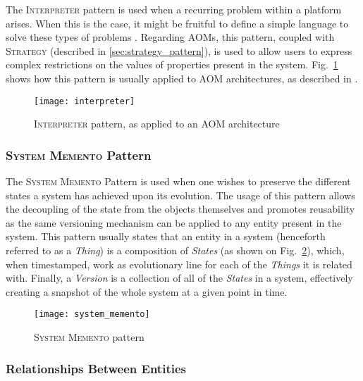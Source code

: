 The \textsc{Interpreter} pattern is used when a recurring problem within a platform arises. When this is the case, it might be fruitful to define a simple language to solve these types of problems \cite{gang_of_four}. Regarding AOMs, this pattern, coupled with \textsc{Strategy} (described in \ref{sec:strategy_pattern}), is used to allow users to express complex restrictions on the values of properties present in the system. Fig.~\ref{fig:interpreter_pattern} shows how this pattern is usually applied to AOM architectures, as described in \cite{phd_hugo_ferreira}.

\begin{figure}[H]
  \centering
  \texttt{[image: interpreter]}
  \caption{\textsc{Interpreter} pattern, as applied to an AOM architecture}
  \label{fig:interpreter_pattern}
\end{figure}

\subsubsection{\textsc{System Memento} Pattern}\label{sec:system_memento_pattern}

The \textsc{System Memento} Pattern is used when one wishes to preserve the different states a system has achieved upon its evolution. The usage of this pattern allows the decoupling of the state from the objects themselves and promotes reusability as the same versioning mechanism can be applied to any entity present in the system. This pattern usually states that an entity in a system (henceforth referred to as a \emph{Thing}) is a composition of \emph{States} (as shown on Fig.~\ref{fig:system_memento}), which, when timestamped, work as evolutionary line for each of the \emph{Things} it is related with. Finally, a \emph{Version} is a collection of all of the \emph{States} in a system, effectively creating a snapshot of the whole system at a given point in time.

\begin{figure}[H]
  \centering
  \texttt{[image: system\_memento]}
  \caption{\textsc{System Memento} pattern}
  \label{fig:system_memento}
\end{figure}

\subsubsection{Relationships Between Entities}\label{sec:relationships_between_entities}

